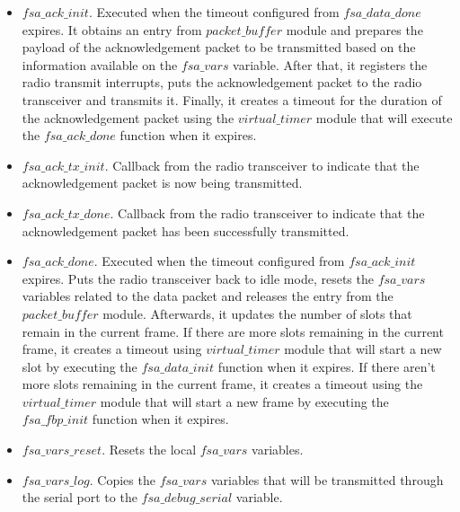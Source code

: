 \begin{itemize}
\item $fsa\_ack\_init$. Executed when the timeout configured from $fsa\_data\_done$ expires. It obtains an entry from $packet\_buffer$ module and prepares the payload of the acknowledgement packet to be transmitted based on the information available on the $fsa\_vars$ variable. After that, it registers the radio transmit interrupts, puts the acknowledgement packet to the radio transceiver and transmits it. Finally, it creates a timeout for the duration of the acknowledgement packet using the $virtual\_timer$ module that will execute the $fsa\_ack\_done$ function when it expires.
\item $fsa\_ack\_tx\_init$. Callback from the radio transceiver to indicate that the acknowledgement packet is now being transmitted.
\item $fsa\_ack\_tx\_done$. Callback from the radio transceiver to indicate that the acknowledgement packet has been successfully transmitted.
\item $fsa\_ack\_done$. Executed when the timeout configured from $fsa\_ack\_init$ expires. Puts the radio transceiver back to idle mode, resets the $fsa\_vars$ variables related to the data packet and releases the entry from the $packet\_buffer$ module. Afterwards, it updates the number of slots that remain in the current frame. If there are more slots remaining in the current frame, it creates a timeout using $virtual\_timer$ module that will start a new slot by executing the $fsa\_data\_init$ function when it expires. If there aren't more slots remaining in the current frame, it creates a timeout using the $virtual\_timer$ module that will start a new frame by executing the $fsa\_fbp\_init$ function when it expires.

\item $fsa\_vars\_reset$. Resets the local $fsa\_vars$ variables.
\item $fsa\_vars\_log$. Copies the $fsa\_vars$ variables that will be transmitted through the serial port to the $fsa\_debug\_serial$ variable.
\end{itemize}

